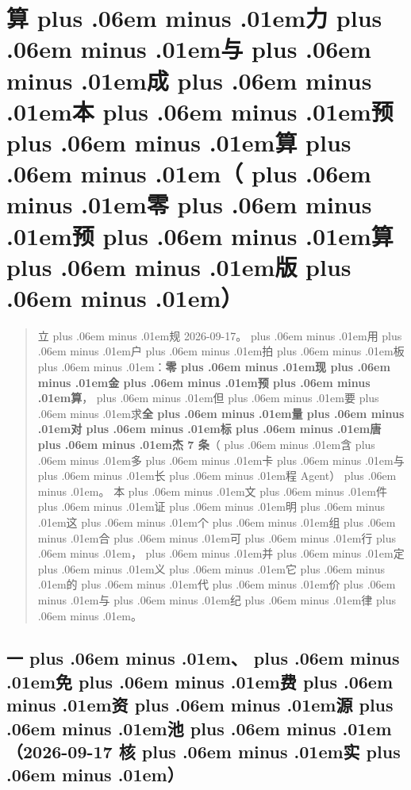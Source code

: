 \documentclass[
]{article}
\def\zh#1{{\zhfont #1}}
\def\zhglue{\hskip0pt plus .06em minus .01em}
\begin{document}
\newpage

\section{\zh{算\zhglue 力\zhglue 与\zhglue 成\zhglue 本\zhglue 预\zhglue 算\zhglue （\zhglue 零\zhglue 预\zhglue 算\zhglue 版\zhglue ）}}\label{ux7b97ux529bux4e0eux6210ux672cux9884ux7b97ux96f6ux9884ux7b97ux7248}

\begin{quote}
\zh{立\zhglue 规} 2026-09-17\zh{。\zhglue 用\zhglue 户\zhglue 拍\zhglue 板\zhglue ：}\textbf{\zh{零\zhglue 现\zhglue 金\zhglue 预\zhglue 算}}\zh{，\zhglue 但\zhglue 要\zhglue 求}\textbf{\zh{全\zhglue 量\zhglue 对\zhglue 标\zhglue 唐\zhglue 杰} 7 \zh{条}}\zh{（\zhglue 含\zhglue 多\zhglue 卡\zhglue 与\zhglue 长\zhglue 程} Agent\zh{）\zhglue 。} \zh{本\zhglue 文\zhglue 件\zhglue 证\zhglue 明\zhglue 这\zhglue 个\zhglue 组\zhglue 合\zhglue 可\zhglue 行\zhglue ，\zhglue 并\zhglue 定\zhglue 义\zhglue 它\zhglue 的\zhglue 代\zhglue 价\zhglue 与\zhglue 纪\zhglue 律\zhglue 。}
\end{quote}

\subsection{\zh{一\zhglue 、\zhglue 免\zhglue 费\zhglue 资\zhglue 源\zhglue 池\zhglue （}2026-09-17 \zh{核\zhglue 实\zhglue ）}}\label{ux4e00ux514dux8d39ux8d44ux6e90ux6c602026-09-17-ux6838ux5b9e}
\end{document}
